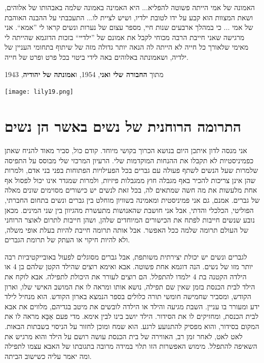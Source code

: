 \documentclass[14pt, article, extrafontsizes, twopage, a4paper]{memoir}
\newcommand{\attr}[1]{
{\raggedright\smaller#1}
}
\begin{document}
האמונה של אמי הייתה פשוטה להפליא... היא האמינה באמונה שלמה באבהותו של אלוהים, ושאת המצוות הוא קבע על ידו לטובת ילדיו, ושיש לציית לו... התעכבתי על ההבנה האוהבת של אמי ... כי במהלך ארבעים שנות חיי, מספר עצום של נערות ונשים קראו לי ”אמא“. אני מרגישה שאני חייבת הרבה מכוחי לקבל את אמונם של ”ילדיי“ בזכות הדוגמא שהייתה לי מאימי שלאורך כל חייה לא הייתה לה הנאה יותר גדולה מזה של שיתוף בתחומי העניין של ילדיה, ושאמונתה באלוהים באה לידי ביטוי בכל פרט ופרט של חייה.

\attr{מתוך \textbf{החבורה שלי ואני}, 1954, ו\textbf{אמונתה של יהודיה}, 1943}

{
  \centering
\vspace*{.5\baselineskip}
\texttt{[image: lily19.png]}\\

}

\chapter{התרומה הרוחנית של נשים באשר הן נשים}

אני מנסה לדון איתכן היום בנושא הכרוך בקושי מיוחד. קודם כול,
סביר מאוד להניח שאתן כפמיניסטיות לא תקבלו
את ההנחות המוקדמות שלי. הרעיון המרכזי שלי מבוסס על התפיסה
שלמרות שעל הנשים לשתף פעולה עם גברים בכל
הפעילויות הפתוחות בפני בני אדם, ולמרות שהן אינן צריכות
להכיר באף מגבלה חוץ ממגבלות פיזיות, ולמרות שמגדר
אינו יכול לפסול אף אחת מלעשות את מה חשה שמתאים לה, בכל זאת לנשים יש כישורים מסוימים
שונים מאלה של גברים. אמנם,
גם אני פמיניסטית ומאמינה בשוויון מוחלט בין
גברים ונשים בתחום החברתי, הפוליטי, הכלכלי והדתי,
אבל אני חושבת שהאנושות מתעשרת
מהגיוון בין שני המינים. מכאן נובע שנשים חייבות
לפתח את הכישורים המיוחדים שלהן, ושהן חייבות לתרום
לאוצר הרוחני של העולם תרומה שלמה
ככל האפשר. אבל אותה תרומה חייבת להיות בעלת אופי משלה,
ולא להיות חיקוי או העתק של תרומת הגברים.

לגברים ונשים יש יכולת יצירתית משותפת, אבל
גברים מסוגלים לפעול באובייקטיביות רבה יותר מזו של נשים. הנה
דוגמא אחת פשוטה. אבא ואימא רוצים שהילד הקטן שלהם
בן 4 או הילדה הקטנה בת 4 ילמדו להתפלל. הם רוצים
לעורר את היכולת לתפילה. אבא לוקח את הילד
לבית הכנסת בזמן שאין שם תפילה, נושא
אותו ומראה לו את המושב האישי שלו,
וארון הקודש, ומסביר שחמישה חומשי תורה
כלולים בספר הנמצא בארון הקודש.
הוא מנחיל לילד ידע ומעורר בו עניין. השבת
מגיעה והילד או הילדה לובשים את מיטב בגדיהם,
מלווים את אבא לבית הכנסת, ומחזיקים לו את הסידור.
הילד יושב בינו לבין  אימא.
מדי פעם אַבָּא מראה לו את המקום בסידור, והוא מפסיק
להתנועע לרגע. הוא שמח ומוכן לחזור
על הניסוי בשבתות הבאות. לאט לאט, לאחר
זמן רב, האווירה של בית הכנסת עושה רושם
על הילד והוא מרגיש את השאיפה להתפלל.
מימוש האפשרות הזו תלוי במידה מרובה
בתגובתו של האבא עצמו לתפילה
ומה יאמר עליה כשישוב הביתה.
\end{document}
